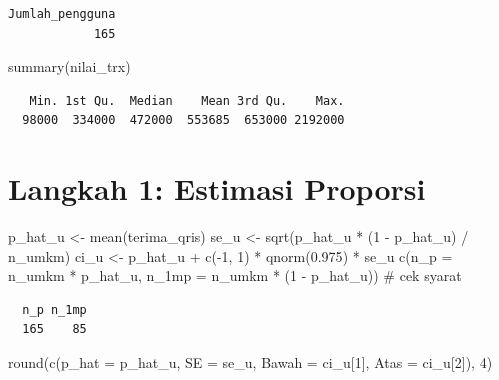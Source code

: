 \documentclass[
  indonesian,
  letterpaper,
]{book}
\newenvironment{Shaded}{\begin{snugshade}}{\end{snugshade}}
\newcommand{\AttributeTok}[1]{\textcolor[rgb]{0.40,0.45,0.13}{#1}}
\newcommand{\CommentTok}[1]{\textcolor[rgb]{0.37,0.37,0.37}{#1}}
\newcommand{\DecValTok}[1]{\textcolor[rgb]{0.68,0.00,0.00}{#1}}
\newcommand{\FloatTok}[1]{\textcolor[rgb]{0.68,0.00,0.00}{#1}}
\newcommand{\FunctionTok}[1]{\textcolor[rgb]{0.28,0.35,0.67}{#1}}
\newcommand{\NormalTok}[1]{\textcolor[rgb]{0.00,0.23,0.31}{#1}}
\newcommand{\OtherTok}[1]{\textcolor[rgb]{0.00,0.23,0.31}{#1}}
\newcommand{\SpecialCharTok}[1]{\textcolor[rgb]{0.37,0.37,0.37}{#1}}
\begin{document}
\begin{verbatim}
Jumlah_pengguna 
            165 
\end{verbatim}

\begin{Shaded}
\begin{Highlighting}[]
\FunctionTok{summary}\NormalTok{(nilai\_trx)}
\end{Highlighting}
\end{Shaded}

\begin{verbatim}
   Min. 1st Qu.  Median    Mean 3rd Qu.    Max. 
  98000  334000  472000  553685  653000 2192000 
\end{verbatim}

\section{Langkah 1: Estimasi
Proporsi}\label{langkah-1-estimasi-proporsi}

\begin{Shaded}
\begin{Highlighting}[]
\NormalTok{p\_hat\_u }\OtherTok{\textless{}{-}} \FunctionTok{mean}\NormalTok{(terima\_qris)}
\NormalTok{se\_u }\OtherTok{\textless{}{-}} \FunctionTok{sqrt}\NormalTok{(p\_hat\_u }\SpecialCharTok{*}\NormalTok{ (}\DecValTok{1} \SpecialCharTok{{-}}\NormalTok{ p\_hat\_u) }\SpecialCharTok{/}\NormalTok{ n\_umkm)}
\NormalTok{ci\_u }\OtherTok{\textless{}{-}}\NormalTok{ p\_hat\_u }\SpecialCharTok{+} \FunctionTok{c}\NormalTok{(}\SpecialCharTok{{-}}\DecValTok{1}\NormalTok{, }\DecValTok{1}\NormalTok{) }\SpecialCharTok{*} \FunctionTok{qnorm}\NormalTok{(}\FloatTok{0.975}\NormalTok{) }\SpecialCharTok{*}\NormalTok{ se\_u}
\FunctionTok{c}\NormalTok{(}\AttributeTok{n\_p =}\NormalTok{ n\_umkm }\SpecialCharTok{*}\NormalTok{ p\_hat\_u, }\AttributeTok{n\_1mp =}\NormalTok{ n\_umkm }\SpecialCharTok{*}\NormalTok{ (}\DecValTok{1} \SpecialCharTok{{-}}\NormalTok{ p\_hat\_u)) }\CommentTok{\# cek syarat}
\end{Highlighting}
\end{Shaded}

\begin{verbatim}
  n_p n_1mp 
  165    85 
\end{verbatim}

\begin{Shaded}
\begin{Highlighting}[]
\FunctionTok{round}\NormalTok{(}\FunctionTok{c}\NormalTok{(}\AttributeTok{p\_hat =}\NormalTok{ p\_hat\_u, }\AttributeTok{SE =}\NormalTok{ se\_u, }\AttributeTok{Bawah =}\NormalTok{ ci\_u[}\DecValTok{1}\NormalTok{], }\AttributeTok{Atas =}\NormalTok{ ci\_u[}\DecValTok{2}\NormalTok{]), }\DecValTok{4}\NormalTok{)}
\end{Highlighting}
\end{Shaded}
\end{document}

